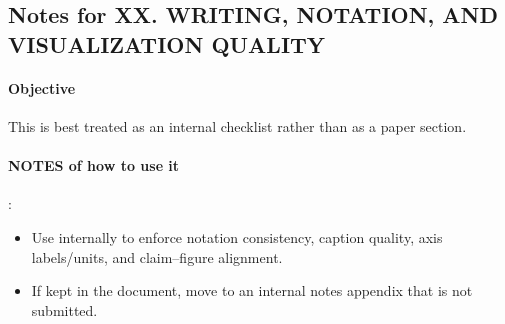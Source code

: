\subsection*{Notes for XX. WRITING, NOTATION, AND VISUALIZATION QUALITY}
\paragraph{Objective}
This is best treated as an internal checklist rather than as a paper section.

\paragraph{NOTES of how to use it}:
\begin{itemize}
  \item Use internally to enforce notation consistency, caption quality, axis labels/units, and claim--figure alignment.
  \item If kept in the document, move to an internal notes appendix that is not submitted.
\end{itemize}
